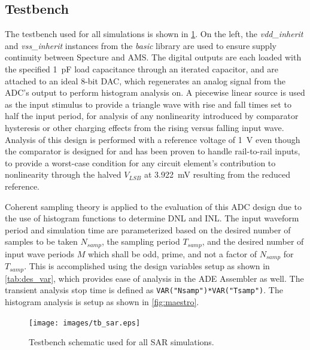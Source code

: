 \documentclass[11pt,letterpaper]{article}
\begin{document}
\subsection{Testbench}

The testbench used for all simulations is shown in \cref{fig:tb_sar}. On the left, the \emph{vdd\_inherit} and \emph{vss\_inherit} instances from the \emph{basic} library are used to ensure supply continuity between Specture and AMS\@. The digital outputs are each loaded with the specified \qty{1}{\pF} load capacitance through an iterated capacitor, and are attached to an ideal 8-bit DAC, which regenerates an analog signal from the ADC's output to perform histogram analysis on. A piecewise linear source is used as the input stimulus to provide a triangle wave with rise and fall times set to half the input period, for analysis of any nonlinearity introduced by comparator hysteresis or other charging effects from the rising versus falling input wave. Analysis of this design is performed with a reference voltage of \qty{1}{\V} even though the comparator is designed for and has been proven to handle rail-to-rail inputs, to provide a worst-case condition for any circuit element's contribution to nonlinearity through the halved \(V_{LSB}\) at \qty{3.922}{\mV} resulting from the reduced reference.

Coherent sampling theory is applied to the evaluation of this ADC design due to the use of histogram functions to determine DNL and INL\@. The input waveform period and simulation time are parameterized based on the desired number of samples to be taken \(N_{samp}\), the sampling period \(T_{samp}\), and the desired number of input wave periods \(M\) which shall be odd, prime, and not a factor of \(N_{samp}\) for \(T_{samp}\). This is accomplished using the design variables setup as shown in \cref{tab:des_var}, which provides ease of analysis in the ADE Assembler as well. The transient analysis stop time is defined as \texttt{VAR("Nsamp")*VAR("Tsamp")}. The histogram analysis is setup as shown in \cref{fig:maestro}.

\begin{figure}[htbp!]
		\centering
	    \texttt{[image: images/tb\_sar.eps]}
		\caption{Testbench schematic used for all SAR simulations.}\label{fig:tb_sar}
\end{figure}
\end{document}
